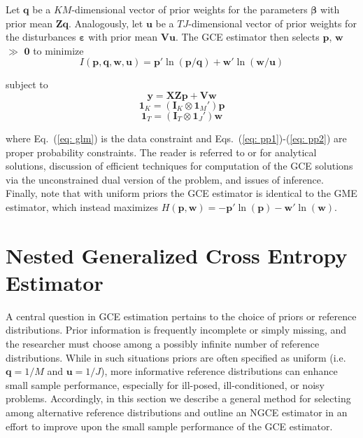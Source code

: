 \documentclass{elsarticle}
\begin{document}
Let $\mathbf{q}$ be a $KM$-dimensional vector of prior weights for the 
parameters $\mathbf{\beta}$ with prior mean $\mathbf{Zq}$.
Analogously, let $\mathbf{u}$ be a $TJ$-dimensional vector of prior weights 
for the disturbances $\mathbf{\varepsilon}$ with prior mean $\mathbf{Vu}$.
The GCE estimator then selects $\mathbf{p}$, $\mathbf{w}$ $\gg$ 
$\mathbf{0}$ to minimize 
\begin{equation}
I({\mathbf{p}, \mathbf{q}, \mathbf{w}, \mathbf{u}}) = 
\mathbf{p}' \ln (\mathbf{p}/\mathbf{q}) + 
\mathbf{w}' \ln (\mathbf{w}/\mathbf{u})
\label{eq: ce}
\end{equation}

\noindent
subject to
\begin{equation}
\mathbf{y} = \mathbf{X Z p} 
+ \mathbf{V w}
\label{eq: glm}
\end{equation}
\begin{equation}
\mathbf{1}_K = (\mathbf{I}_K \otimes \mathbf{1}_M')\mathbf{p}
\label{eq: pp1}
\end{equation}
\begin{equation}
\mathbf{1}_T = (\mathbf{I}_T \otimes \mathbf{1}_J')\mathbf{w}
\label{eq: pp2}
\end{equation}

\noindent
where Eq.\ (\ref{eq: glm}) is the data constraint and Eqs.\ 
(\ref{eq: pp1})-(\ref{eq: pp2}) are proper probability constraints.
The reader is referred to \citet[Chap.\ 6]{golan1996} or 
\citet[Chap.\ 6]{golan2008} for analytical solutions, discussion of 
efficient techniques for computation of the GCE solutions via the 
unconstrained dual version of the problem, and issues of inference.
Finally, note that with uniform priors the GCE estimator is identical to 
the GME estimator, which instead maximizes $H(\mathbf{p},\mathbf{w}) 
= - \mathbf{p}' \ln (\mathbf{p}) - \mathbf{w}' \ln (\mathbf{w})$.


\section{Nested Generalized Cross Entropy Estimator}
\label{sec: ngce}

A central question in GCE estimation pertains to the choice of 
priors or reference distributions.
Prior information is frequently incomplete or simply missing, and 
the researcher must choose among a possibly infinite number of 
reference distributions. 
While in such situations priors are often specified as uniform (i.e.\ 
$\mathbf{q}=1/M$ and $\mathbf{u}=1/J$), more informative 
reference distributions can enhance small sample performance, especially 
for ill-posed, ill-conditioned, or noisy problems.
Accordingly, in this section we describe a general method for selecting among 
alternative reference distributions and outline an NGCE estimator in an 
effort to improve upon the small sample performance of the GCE estimator. 
\end{document}
